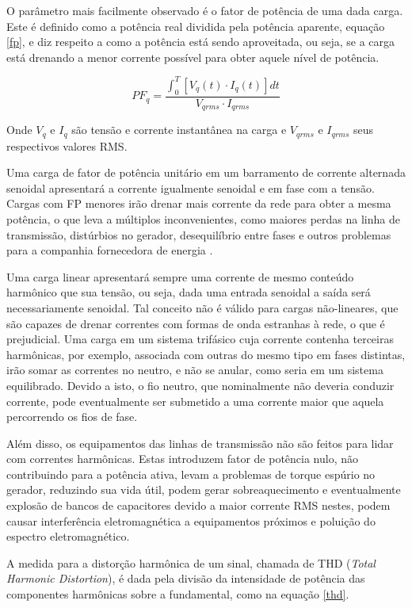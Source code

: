 \documentclass[
        12pt,
        openany, %
        oneside, %
        a4paper,			
        english,			
        brazil
        ]{abntbibufjf}
\begin{document}
O parâmetro mais facilmente observado é o fator de potência de uma dada carga. Este é definido como a potência real dividida pela potência aparente, equação \ref{fp}, e diz respeito a como a potência está sendo aproveitada, ou seja, se a carga está drenando a menor corrente possível para obter aquele nível de potência.

\begin{equation}
PF_q=\frac{\int_{0}^{T} [V_q(t)\cdot I_q(t)] dt}{V_{q rms} \cdot I_{q rms}}
\label{fp}
\end{equation}

Onde $V_q$ e $I_q$ são tensão e corrente instantânea na carga e $V_{q rms}$ e $I_{q rms}$ seus respectivos valores RMS.

Uma carga de fator de potência unitário em um barramento de corrente alternada senoidal apresentará a corrente igualmente senoidal e em fase com a tensão. Cargas com FP menores irão drenar mais corrente da rede para obter a mesma potência, o que leva a múltiplos inconvenientes, como maiores perdas na linha de transmissão, distúrbios no gerador, desequilíbrio entre fases e outros problemas para a companhia fornecedora de energia \cite{sadiku}.


Uma carga linear apresentará sempre uma corrente de mesmo conteúdo harmônico que sua tensão, ou seja, dada uma entrada senoidal a saída será necessariamente senoidal. Tal conceito não é válido para cargas não-lineares, que são capazes de drenar correntes com formas de onda estranhas à rede, o que é prejudicial. Uma carga em um sistema trifásico cuja corrente contenha terceiras harmônicas, por exemplo, associada com outras do mesmo tipo em fases distintas, irão somar as correntes no neutro, e não se anular, como seria em um sistema equilibrado. Devido a isto, o fio neutro, que nominalmente não deveria conduzir corrente, pode eventualmente ser submetido a uma corrente maior que aquela percorrendo os fios de fase.

Além disso, os equipamentos das linhas de transmissão não são feitos para lidar com correntes harmônicas. Estas introduzem fator de potência nulo, não contribuindo para a potência ativa, levam a problemas de torque espúrio no gerador, reduzindo sua vida útil, podem gerar sobreaquecimento e eventualmente explosão de bancos de capacitores devido a maior corrente RMS nestes, podem causar interferência eletromagnética a equipamentos próximos e poluição do espectro eletromagnético.

A medida para a distorção harmônica de um sinal, chamada de THD (\textit{Total Harmonic Distortion}), é dada pela divisão da intensidade de potência das componentes harmônicas sobre a fundamental, como na equação \ref{thd}.
\end{document}
